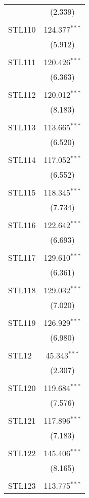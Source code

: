 \begin{table}[!htbp]
\begin{tabular}{@{\extracolsep{5pt}}lc}
  & (2.339) \\ 
  & \\ 
 STL110 & 124.377$^{***}$ \\ 
  & (5.912) \\ 
  & \\ 
 STL111 & 120.426$^{***}$ \\ 
  & (6.363) \\ 
  & \\ 
 STL112 & 120.012$^{***}$ \\ 
  & (8.183) \\ 
  & \\ 
 STL113 & 113.665$^{***}$ \\ 
  & (6.520) \\ 
  & \\ 
 STL114 & 117.052$^{***}$ \\ 
  & (6.552) \\ 
  & \\ 
 STL115 & 118.345$^{***}$ \\ 
  & (7.734) \\ 
  & \\ 
 STL116 & 122.642$^{***}$ \\ 
  & (6.693) \\ 
  & \\ 
 STL117 & 129.610$^{***}$ \\ 
  & (6.361) \\ 
  & \\ 
 STL118 & 129.032$^{***}$ \\ 
  & (7.020) \\ 
  & \\ 
 STL119 & 126.929$^{***}$ \\ 
  & (6.980) \\ 
  & \\ 
 STL12 & 45.343$^{***}$ \\ 
  & (2.307) \\ 
  & \\ 
 STL120 & 119.684$^{***}$ \\ 
  & (7.576) \\ 
  & \\ 
 STL121 & 117.896$^{***}$ \\ 
  & (7.183) \\ 
  & \\ 
 STL122 & 145.406$^{***}$ \\ 
  & (8.165) \\ 
  & \\ 
 STL123 & 113.775$^{***}$ \\ 

\end{tabular}
\end{table}
